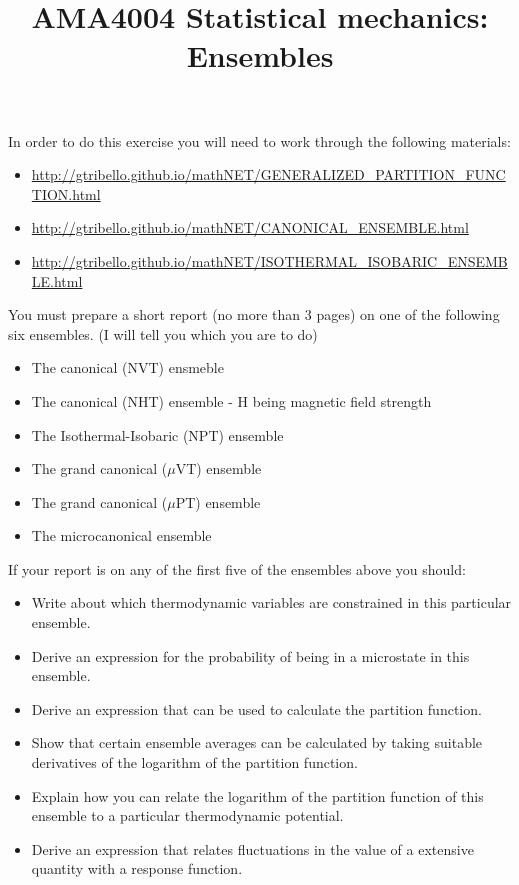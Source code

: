\documentclass[a4paper]{article}
\title{
\vspace{-3em}
\begin{tcolorbox}
\Huge\sffamily AMA4004 Statistical mechanics: Ensembles  
\end{tcolorbox}
\vspace{-3em}
}
\date{}
\begin{document}
\maketitle

In order to do this exercise you will need to work through the following materials:

\begin{itemize}
\item \href{http://gtribello.github.io/mathNET/GENERALIZED\_PARTITION\_FUNCTION.html}{http://gtribello.github.io/mathNET/GENERALIZED\_PARTITION\_FUNCTION.html}
\item \href{http://gtribello.github.io/mathNET/CANONICAL\_ENSEMBLE.html}{http://gtribello.github.io/mathNET/CANONICAL\_ENSEMBLE.html}
\item \href{http://gtribello.github.io/mathNET/ISOTHERMAL\_ISOBARIC\_ENSEMBLE.html}{http://gtribello.github.io/mathNET/ISOTHERMAL\_ISOBARIC\_ENSEMBLE.html}
\end{itemize}

You must prepare a short report (no more than 3 pages) on one of the following six ensembles.  (I will tell you which you are to do)

\begin{itemize}
\item The canonical (NVT) ensmeble
\item The canonical (NHT) ensemble - H being magnetic field strength
\item The Isothermal-Isobaric (NPT) ensemble 
\item The grand canonical ($\mu$VT) ensemble
\item The grand canonical ($\mu$PT) ensemble
\item The microcanonical ensemble
\end{itemize}

If your report is on any of the first five of the ensembles above you should:

\begin{itemize}
\item Write about which thermodynamic variables are constrained in this particular ensemble.
\item Derive an expression for the probability of being in a microstate in this ensemble.
\item Derive an expression that can be used to calculate the partition function.
\item Show that certain ensemble averages can be calculated by taking suitable derivatives of the logarithm of the partition function.
\item Explain how you can relate the logarithm of the partition function of this ensemble to a particular thermodynamic potential.
\item Derive an expression that relates fluctuations in the value of a extensive quantity with a response function. 
\end{itemize}
\end{document}
